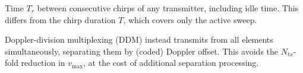 \begin{definition}
Time $T_r$ between consecutive chirps of any transmitter, including idle time. This differs from the chirp duration $T$, which covers only the active sweep.
\end{definition}

\begin{remark}
Doppler-division multiplexing (DDM) instead transmits from all elements simultaneously, separating them by (coded) Doppler offset. This avoids the $N_{tx}$-fold reduction in $v_{\max}$, at the cost of additional separation processing.
\end{remark}

